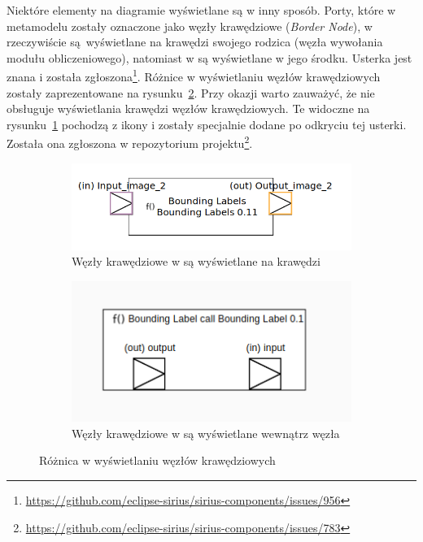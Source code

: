 Niektóre elementy na diagramie wyświetlane są w inny sposób. Porty, które w
metamodelu zostały oznaczone jako węzły krawędziowe (\emph{Border Node}), w
\SiriusDesktop{} rzeczywiście są~wyświetlane na krawędzi swojego rodzica
(węzła wywołania modułu obliczeniowego), natomiast w \SiriusWeb{} są
wyświetlane w jego środku. Usterka jest znana i została zgłoszona\footnote{
	\url{https://github.com/eclipse-sirius/sirius-components/issues/956}
}. Różnice w wyświetlaniu węzłów krawędziowych zostały zaprezentowane na
rysunku~\ref{rys:border-node-difference}.
Przy okazji warto zauważyć, że \SiriusWeb{} nie obsługuje wyświetlania
krawędzi węzłów krawędziowych. Te widoczne na
rysunku~\ref{rys:border-node-sirius-web} pochodzą z ikony i zostały specjalnie
dodane po odkryciu tej usterki. Została ona zgłoszona w repozytorium
projektu\footnote{
	\url{https://github.com/eclipse-sirius/sirius-components/issues/783}}.

\begin{figure}
	\centering
	\begin{subfigure}{.49\textwidth}
		\centering
		\includegraphics[width=.99\linewidth]{./images/border-node-sirius-desktop.png}
		\caption{Węzły krawędziowe w \SiriusDesktop{} są wyświetlane na
      krawędzi}
	\end{subfigure}
	\begin{subfigure}{.49\textwidth}
		\centering
		\includegraphics[width=.99\linewidth]{./images/border-node-sirius-web.png}
		\caption{Węzły krawędziowe w \SiriusWeb{} są wyświetlane wewnątrz
      węzła}\label{rys:border-node-sirius-web}
	\end{subfigure}

    \caption{Różnica w wyświetlaniu węzłów
      krawędziowych}\label{rys:border-node-difference}
\end{figure}

